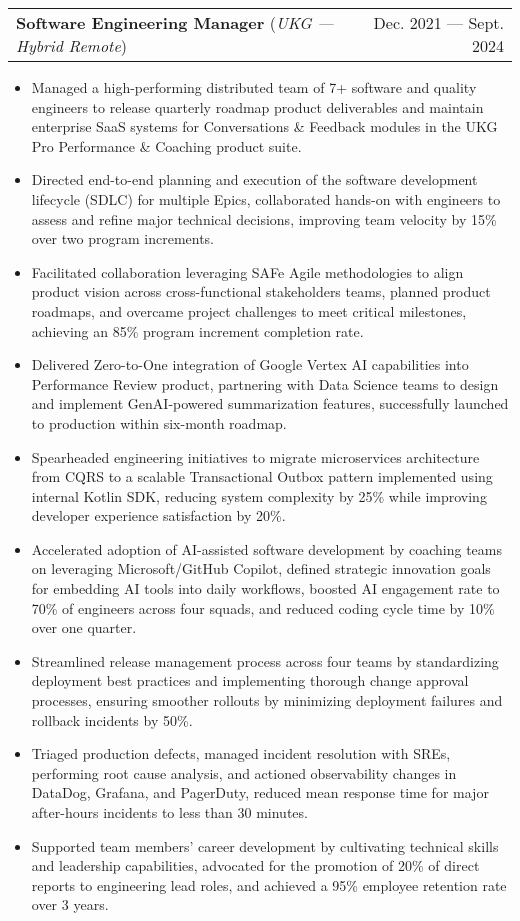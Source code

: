 \documentclass[letterpaper,10pt]{article}
\makeatletter
\newcommand{\experienceHeading}[4]{
  \item
    \begin{tabular*}{\textwidth}[t]{l@{\extracolsep{\fill}}r}
      \textbf{#1} (\textit{\small#3 --- \textit{\small #4}})& #2 \\
    \end{tabular*}\vspace{-4pt}
}
\newcommand{\experienceStart}{\begin{itemize}[leftmargin=16pt, rightmargin=8pt]}
\newcommand{\experienceEnd}{\end{itemize}\vspace{-7pt}}
\newcommand{\experience}[1]{\item\small{{#1 \vspace{-0.5pt}}}}
\makeatother
\begin{document}
  \experienceHeading{Software Engineering Manager}
    {Dec. 2021 --- Sept. 2024}
    {UKG}
    {Hybrid Remote}
  \experienceStart{}
    \experience{
      Managed a high-performing distributed team of 7+ software and quality engineers to release quarterly roadmap product deliverables and maintain enterprise SaaS systems for  Conversations \& Feedback modules in the UKG Pro Performance \& Coaching product suite.
    }
    \experience{
      Directed end-to-end planning and execution of the software development lifecycle (SDLC) for multiple Epics, collaborated hands-on with engineers to assess and refine major technical decisions, improving team velocity by 15\% over two program increments.
    }
    \experience{
      Facilitated collaboration leveraging SAFe Agile methodologies to align product vision across cross-functional stakeholders teams, planned product roadmaps, and overcame project challenges to meet critical milestones, achieving an 85\% program increment completion rate.
    }
    \experience{
      Delivered Zero-to-One integration of Google Vertex AI capabilities into Performance Review product, partnering with Data Science teams to design and implement GenAI-powered summarization features, successfully launched to production within six-month roadmap.
    }
    \experience{
      Spearheaded engineering initiatives to migrate microservices architecture from CQRS to a scalable Transactional Outbox pattern implemented using internal Kotlin SDK, reducing system complexity by 25\% while improving developer experience satisfaction by 20\%.
    }
    \experience{
      Accelerated adoption of AI-assisted software development by coaching teams on leveraging Microsoft/GitHub Copilot, defined strategic innovation goals for embedding AI tools into daily workflows, boosted AI engagement rate to 70\% of engineers across four squads, and reduced coding cycle time by 10\% over one quarter.
    }
    \experience{
      Streamlined release management process across four teams by standardizing deployment best practices and implementing thorough change approval processes, ensuring smoother rollouts by minimizing deployment failures and rollback incidents by 50\%.
    }
    \experience{
      Triaged production defects, managed incident resolution with SREs, performing root cause analysis, and actioned observability changes in DataDog, Grafana, and PagerDuty, reduced mean response time for major after-hours incidents to less than 30 minutes.
    }
    \experience{
      Supported team members’ career development by cultivating technical skills and leadership capabilities, advocated for the promotion of 20\% of direct reports to engineering lead roles, and achieved a 95\% employee retention rate over 3 years.
    }
  \experienceEnd{}
\end{document}
